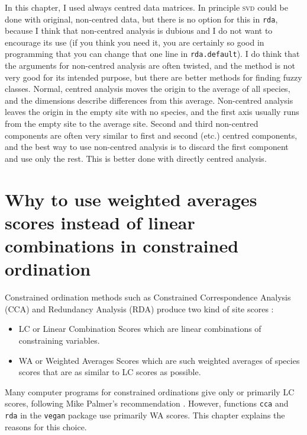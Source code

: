 \documentclass[a4paper]{article}
\begin{document}
In this chapter, I used always centred data matrices.  In principle
\textsc{svd} could be done with original, non-centred data, but
there is no option for this in \texttt{rda}, because I think that
non-centred analysis is dubious and I do not want to encourage its use
(if you think you need it, you are certainly so good in programming
that you can change that one line in \texttt{rda.default}).  I do
think that the arguments for non-centred analysis are often twisted,
and the method is not very good for its intended purpose, but there
are better methods for finding fuzzy classes.  Normal, centred
analysis moves the origin to the average of all species, and the
dimensions describe differences from this average.  Non-centred
analysis leaves the origin in the empty site with no species, and the
first axis usually runs from the empty site to the average
site. Second and third non-centred components are often very similar
to first and second (etc.) centred components, and the best way to use
non-centred analysis is to discard the first component and use only
the rest. This is better done with directly centred analysis.  


\section{Why to use weighted averages scores instead of linear
  combinations in constrained ordination}

Constrained ordination methods such as Constrained Correspondence
Analysis (CCA) and Redundancy Analysis (RDA) produce two kind of site
scores \cite{Braak86, Palmer93}:
\begin{itemize}
\item
LC or Linear Combination Scores which are linear combinations of
constraining variables.
\item
WA or Weighted Averages Scores which are such weighted averages of
species scores that are as similar to LC scores as possible.
\end{itemize}
Many computer programs for constrained ordinations give only or
primarily LC scores, following Mike Palmer's recommendation
\cite{Palmer93}.  However, functions \texttt{cca} and \texttt{rda} in
the \texttt{vegan} package use primarily WA scores. This chapter
explains the reasons for this choice.
\end{document}

